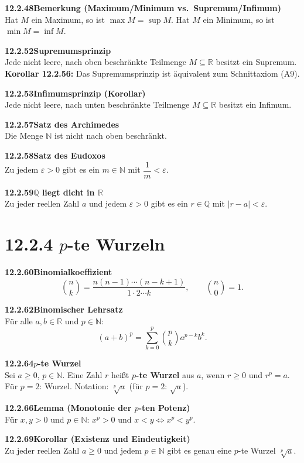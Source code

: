 \documentclass[a4paper,12pt]{article}
\newcommand{\gentry}[3]{%
  \noindent\textbf{#1\quad #2}\nopagebreak\\[0.2em]
  #3\par\smallskip
}
\begin{document}
\gentry{12.2.48}{Bemerkung (Maximum/Minimum vs.\ Supremum/Infimum)}{%
  Hat $M$ ein Maximum, so ist $\max M = \sup M$. Hat $M$ ein Minimum, so ist $\min M = \inf M$.
}

\gentry{12.2.52}{Supremumsprinzip}{%
  Jede nicht leere, nach oben beschränkte Teilmenge $M \subseteq \mathbb{R}$
  besitzt ein Supremum.\\
  \textbf{Korollar 12.2.56:} Das Supremumsprinzip ist äquivalent zum Schnittaxiom (A9).
}

\gentry{12.2.53}{Infimumsprinzip (Korollar)}{%
  Jede nicht leere, nach unten beschränkte Teilmenge $M \subseteq \mathbb{R}$
  besitzt ein Infimum.
}

\gentry{12.2.57}{Satz des Archimedes}{%
  Die Menge $\mathbb{N}$ ist nicht nach oben beschränkt.
}

\gentry{12.2.58}{Satz des Eudoxos}{%
  Zu jedem $\varepsilon > 0$ gibt es ein $m \in \mathbb{N}$ mit $\dfrac{1}{m} < \varepsilon$.
}

\gentry{12.2.59}{$\mathbb{Q}$ liegt dicht in $\mathbb{R}$}{%
  Zu jeder reellen Zahl $a$ und jedem $\varepsilon > 0$ gibt es ein $r \in \mathbb{Q}$
  mit $|r - a| < \varepsilon$.
}

\section*{12.2.4 \quad $p$-te Wurzeln}

\gentry{12.2.60}{Binomialkoeffizient}{%
  \[
    \binom{n}{k} = \frac{n(n-1)\cdots(n-k+1)}{1 \cdot 2 \cdots k}, \qquad \binom{n}{0} = 1.
  \]
}

\gentry{12.2.62}{Binomischer Lehrsatz}{%
  Für alle $a,b \in \mathbb{R}$ und $p \in \mathbb{N}$:
  \[
    (a+b)^p = \sum_{k=0}^{p} \binom{p}{k} a^{p-k} b^k.
  \]
}

\gentry{12.2.64}{$p$-te Wurzel}{%
  Sei $a \geq 0$, $p \in \mathbb{N}$. Eine Zahl $r$ heißt \textbf{$p$-te Wurzel} aus $a$, wenn
  $r \geq 0$ und $r^p = a$.
  Für $p = 2$: Wurzel. Notation: $\sqrt[p]{a}$ (für $p=2$: $\sqrt{a}$).
}

\gentry{12.2.66}{Lemma (Monotonie der $p$-ten Potenz)}{%
  Für $x, y > 0$ und $p \in \mathbb{N}$: $x^p > 0$ und $x < y \Leftrightarrow x^p < y^p$.
}

\gentry{12.2.69}{Korollar (Existenz und Eindeutigkeit)}{%
  Zu jeder reellen Zahl $a \geq 0$ und jedem $p \in \mathbb{N}$ gibt es genau eine
  $p$-te Wurzel $\sqrt[p]{a}$.
}
\end{document}
